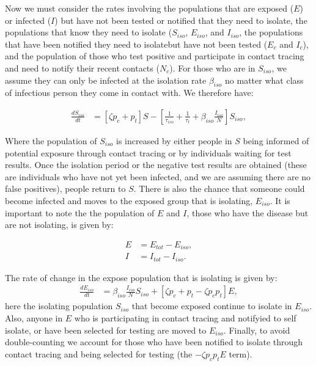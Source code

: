 \documentclass[notitlepage, superscriptaddress]{revtex4-2}
\begin{document}
Now we must consider the rates involving the populations that are exposed ($E$) or infected ($I$) but have not been tested or notified that they need to isolate, the populations that know they need to isolate ($S_{iso}$, $E_{iso}$, and $I_{iso}$, the populations that have been notified they need to isolatebut have not been tested ($E_{c}$ and $I_{c}$), and the population of those who test positive and participate in contact tracing and need to notify their recent contacts ($N_c$). For those who are in $S_{iso}$, we assume they can only be infected at the isolation rate $\beta_{iso}$ no matter what class of infectious person they come in contact with. We therefore have:

\begin{eqnarray}
\label{E:dS_iso}
\frac{dS_{iso}}{dt} &= [\zeta p_{c}+ p_{t}] S - [\frac{1}{\tau_{iso}} + \frac{1}{\tau_t} + \beta_{iso} \frac{I_{iso}}{N}] S_{iso},
\end{eqnarray}

Where the population of $S_{iso}$ is increased by either people in $S$ being informed of potential exposure through contact tracing or by individuals waiting for test results. Once the isolation period or the negative test results are obtained (these are individuals who have not yet been infected, and we are assuming there are no false positives), people return to $S$. There is also the chance that someone could become infected and moves to the exposed group that is isolating, $E_{iso}$. It is important to note the the population of $E$ and $I$, those who have the disease but are not isolating, is given by:

\begin{eqnarray}
\label{E:Etot}
E &= E_{tot} - E_{iso}, \\ 
I &= I_{tot} - I_{iso}.
\end{eqnarray}

The rate of change in the expose population that is isolating is given by:
\begin{eqnarray}
\label{E:dE_iso}
\frac{dE_{iso}}{dt} &= \beta_{iso} \frac{I_{iso}}{N} S_{iso} +  [\zeta p_{c} + p_{t} - \zeta p_{c} p_{t}] E,
\end{eqnarray}
here the isolating population $S_{iso}$ that become exposed continue to isolate in $E_{iso}$. Also, anyone in $E$ who is participating in contact tracing and notifyied to self isolate, or have been selected for testing are moved to $E_{iso}$. Finally, to avoid double-counting we account for those who have been notified to isolate through contact tracing and being selected for testing (the $- \zeta p_{c} p_{t}E$ term). 
\end{document}
